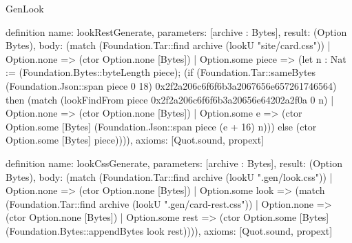 \begin{lexlean}{GenLook}
\begin{semanticmodule}
definition{
  name: lookRestGenerate,
  parameters: [archive : Bytes],
  result: (Option Bytes),
  body: (match (Foundation.Tar::find archive (lookU "site/card.css"))
    | Option.none => (ctor Option.none [Bytes])
    | Option.some piece => (let n : Nat := (Foundation.Bytes::byteLength piece); (if (Foundation.Tar::sameBytes (Foundation.Json::span piece 0 18) 0x2f2a206c6f6f6b3a2067656e657261746564) then (match (lookFindFrom piece 0x2f2a206c6f6f6b3a20656e64202a2f0a 0 n)
      | Option.none => (ctor Option.none [Bytes])
      | Option.some e => (ctor Option.some [Bytes] (Foundation.Json::span piece (e + 16) n))) else (ctor Option.some [Bytes] piece)))),
  axioms: [Quot.sound, propext]
}

definition{
  name: lookCssGenerate,
  parameters: [archive : Bytes],
  result: (Option Bytes),
  body: (match (Foundation.Tar::find archive (lookU ".gen/look.css"))
    | Option.none => (ctor Option.none [Bytes])
    | Option.some look => (match (Foundation.Tar::find archive (lookU ".gen/card-rest.css"))
      | Option.none => (ctor Option.none [Bytes])
      | Option.some rest => (ctor Option.some [Bytes] (Foundation.Bytes::appendBytes look rest)))),
  axioms: [Quot.sound, propext]
}
\end{semanticmodule}
\end{lexlean}
